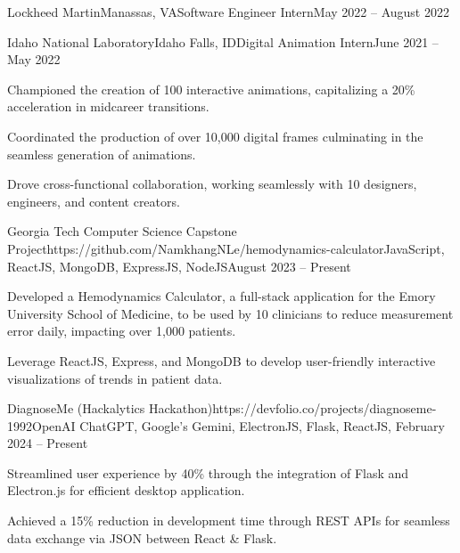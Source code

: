 \documentclass{article}
\begin{document}
\begin{flushleft}
\begin{experience}{Lockheed Martin}{Manassas, VA}{Software Engineer Intern}{May 2022 -- August 2022}
    \end{experience}

    \begin{experience}{Idaho National Laboratory}{Idaho Falls, ID}{Digital Animation Intern}{June 2021 -- May 2022}
        \item Championed the creation of 100 interactive animations, capitalizing a 20\% acceleration in midcareer transitions.
        \item Coordinated the production of over 10,000 digital frames culminating in the seamless generation of animations.
        \item Drove cross-functional collaboration, working seamlessly with 10 designers, engineers, and content creators.
    \end{experience}
    


    \vspace{3pt}

    \begin{project}{Georgia Tech Computer Science Capstone Project}{https://github.com/NamkhangNLe/hemodynamics-calculator}{JavaScript, ReactJS, MongoDB, ExpressJS, NodeJS}{August 2023 -- Present}
        \item Developed a Hemodynamics Calculator, a full-stack application for the Emory University School of Medicine, to be used by 10 clinicians to reduce measurement error daily, impacting over 1,000 patients.
        \item Leverage ReactJS, Express, and MongoDB to develop user-friendly interactive visualizations of trends in patient data.
    \end{project}

    \begin{project}{DiagnoseMe (Hackalytics Hackathon)}{https://devfolio.co/projects/diagnoseme-1992}{OpenAI ChatGPT, Google's Gemini, ElectronJS, Flask, ReactJS, }{February 2024 -- Present}
        \item Streamlined user experience by 40\% through the integration of Flask and Electron.js for efficient desktop application.
        \item Achieved a 15\% reduction in development time through REST APIs for seamless data exchange via JSON between React \& Flask.
    \end{project}


\end{flushleft}
\end{document}
